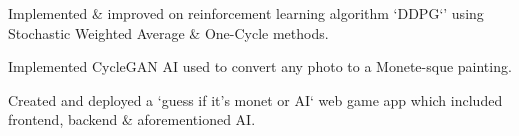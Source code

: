 \documentclass[]{CV}
\begin{document}
\begin{minipage}[t]{0.705\textwidth}
\begin{tightemize}
\item Implemented \& improved on reinforcement learning algorithm `DDPG`' using Stochastic Weighted Average \& One-Cycle methods.

\end{tightemize}

\begin{tightemize}

\item Implemented CycleGAN AI used to convert any photo to a Monete-sque painting.

\item Created and deployed a `guess if it's monet or AI` web game app which included frontend, backend \& aforementioned AI.

\end{tightemize}
\sectionsep








%
%

\end{minipage} 
\end{document}
